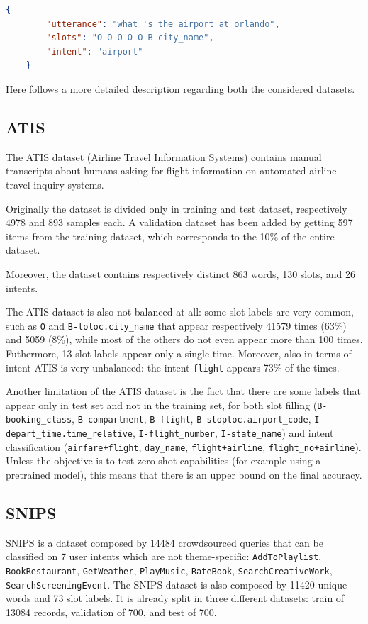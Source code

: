\documentclass[a4paper]{article}
\begin{document}
\begin{lstlisting}[language=json,firstnumber=1,caption={Example of dataset record from ATIS.},captionpos=b,label={lst:json}]
    {
        "utterance": "what 's the airport at orlando",
        "slots": "O O O O O B-city_name",
        "intent": "airport"
    }
\end{lstlisting}

Here follows a more detailed description regarding both the considered datasets.

\subsection{ATIS}
The ATIS dataset (Airline Travel Information Systems) contains manual transcripts about humans asking for flight information on automated airline travel inquiry systems. 

Originally the dataset is divided only in training and test dataset, respectively 4978 and 893 samples each. A validation dataset has been added by getting 597 items from the training dataset, which corresponds to the 10\% of the entire dataset.

Moreover, the dataset contains respectively distinct 863 words, 130 slots, and 26 intents. 

The ATIS dataset is also not balanced at all: some slot labels are very common, such as \texttt{O} and \texttt{B-toloc.city\_name} that appear respectively 41579 times (63\%) and 5059 (8\%), while most of the others do not even appear more than 100 times. Futhermore, 13 slot labels appear only a single time.
Moreover, also in terms of intent ATIS is very unbalanced: the intent \texttt{flight} appears 73\% of the times.

Another limitation of the ATIS dataset is the fact that there are some labels that appear only in test set and not in the training set, for both slot filling (\texttt{B-booking\_class}, \texttt{B-compartment}, \texttt{B-flight}, \texttt{B-stoploc.airport\_code}, \texttt{I-depart\_time.time\_relative}, \texttt{I-flight\_number}, \texttt{I-state\_name}) and intent classification (\texttt{airfare+flight}, \texttt{day\_name}, \texttt{flight+airline}, \texttt{flight\_no+airline}). Unless the objective is to test zero shot capabilities (for example using a pretrained model), this means that there is an upper bound on the final accuracy.

\subsection{SNIPS}
SNIPS is a dataset composed by 14484 crowdsourced queries that can be classified on 7 user intents which are not theme-specific: \texttt{AddToPlaylist}, \texttt{BookRestaurant}, \texttt{GetWeather}, \texttt{PlayMusic}, \texttt{RateBook}, \texttt{SearchCreativeWork}, \texttt{SearchScreeningEvent}. The SNIPS dataset is also composed by 11420 unique words and 73 slot labels. It is already split in three different datasets: train of 13084 records, validation of 700, and test of 700.
\end{document}
